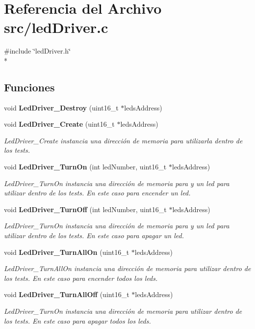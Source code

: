 \section{Referencia del Archivo src/led\-Driver.c}
\label{led_driver_8c}
{\ttfamily \#include \char`\"{}led\-Driver.\-h\char`\"{}}\\*
\subsection*{Funciones}
\begin{DoxyCompactItemize}
\item 
void {\bf Led\-Driver\-\_\-\-Destroy} (uint16\-\_\-t $\ast$leds\-Address)
\item 
void {\bf Led\-Driver\-\_\-\-Create} (uint16\-\_\-t $\ast$leds\-Address)
\begin{DoxyCompactList}\small\item\em Led\-Driver\-\_\-\-Create instancia una dirección de memoria para utilizarla dentro de los tests. \end{DoxyCompactList}\item 
void {\bf Led\-Driver\-\_\-\-Turn\-On} (int led\-Number, uint16\-\_\-t $\ast$leds\-Address)
\begin{DoxyCompactList}\small\item\em Led\-Driver\-\_\-\-Turn\-On instancia una dirección de memoria para y un led para utilizar dentro de los tests. En este caso para encender un led. \end{DoxyCompactList}\item 
void {\bf Led\-Driver\-\_\-\-Turn\-Off} (int led\-Number, uint16\-\_\-t $\ast$leds\-Address)
\begin{DoxyCompactList}\small\item\em Led\-Driver\-\_\-\-Turn\-On instancia una dirección de memoria para y un led para utilizar dentro de los tests. En este caso para apagar un led. \end{DoxyCompactList}\item 
void {\bf Led\-Driver\-\_\-\-Turn\-All\-On} (uint16\-\_\-t $\ast$leds\-Address)
\begin{DoxyCompactList}\small\item\em Led\-Driver\-\_\-\-Turn\-All\-On instancia una dirección de memoria para utilizar dentro de los tests. En este caso para encender todos los leds. \end{DoxyCompactList}\item 
void {\bf Led\-Driver\-\_\-\-Turn\-All\-Off} (uint16\-\_\-t $\ast$leds\-Address)
\begin{DoxyCompactList}\small\item\em Led\-Driver\-\_\-\-Turn\-On instancia una dirección de memoria para utilizar dentro de los tests. En este caso para apagar todos los leds. \end{DoxyCompactList}\end{DoxyCompactItemize}


